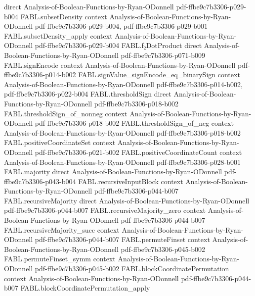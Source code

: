 \begin{theorem}
  {direct}
  {Analysis-of-Boolean-Functions-by-Ryan-ODonnell}
  {pdf-ffbe9c7b3306-p029-b004}
\proofstep
  {FABL.subsetDensity}
  {context}
  {Analysis-of-Boolean-Functions-by-Ryan-ODonnell}
  {pdf-ffbe9c7b3306-p029-b004,
    pdf-ffbe9c7b3306-p029-b001}
\proofstep
  {FABL.subsetDensity_apply}
  {context}
  {Analysis-of-Boolean-Functions-by-Ryan-ODonnell}
  {pdf-ffbe9c7b3306-p029-b004}
\proofstep
  {FABL.f₂DotProduct}
  {direct}
  {Analysis-of-Boolean-Functions-by-Ryan-ODonnell}
  {pdf-ffbe9c7b3306-p071-b009}
\proofstep
  {FABL.signEncode}
  {context}
  {Analysis-of-Boolean-Functions-by-Ryan-ODonnell}
  {pdf-ffbe9c7b3306-p014-b002}
\proofstep
  {FABL.signValue_signEncode_eq_binarySign}
  {context}
  {Analysis-of-Boolean-Functions-by-Ryan-ODonnell}
  {pdf-ffbe9c7b3306-p014-b002,
    pdf-ffbe9c7b3306-p022-b004}
\proofstep
  {FABL.thresholdSign}
  {direct}
  {Analysis-of-Boolean-Functions-by-Ryan-ODonnell}
  {pdf-ffbe9c7b3306-p018-b002}
\proofstep
  {FABL.thresholdSign_of_nonneg}
  {context}
  {Analysis-of-Boolean-Functions-by-Ryan-ODonnell}
  {pdf-ffbe9c7b3306-p018-b002}
\proofstep
  {FABL.thresholdSign_of_neg}
  {context}
  {Analysis-of-Boolean-Functions-by-Ryan-ODonnell}
  {pdf-ffbe9c7b3306-p018-b002}
\proofstep
  {FABL.positiveCoordinateSet}
  {context}
  {Analysis-of-Boolean-Functions-by-Ryan-ODonnell}
  {pdf-ffbe9c7b3306-p021-b002}
\proofstep
  {FABL.positiveCoordinateCount}
  {context}
  {Analysis-of-Boolean-Functions-by-Ryan-ODonnell}
  {pdf-ffbe9c7b3306-p028-b001}
\proofstep
  {FABL.majority}
  {direct}
  {Analysis-of-Boolean-Functions-by-Ryan-ODonnell}
  {pdf-ffbe9c7b3306-p043-b004}
\proofstep
  {FABL.recursiveInputBlock}
  {context}
  {Analysis-of-Boolean-Functions-by-Ryan-ODonnell}
  {pdf-ffbe9c7b3306-p044-b007}
\proofstep
  {FABL.recursiveMajority}
  {direct}
  {Analysis-of-Boolean-Functions-by-Ryan-ODonnell}
  {pdf-ffbe9c7b3306-p044-b007}
\proofstep
  {FABL.recursiveMajority_zero}
  {context}
  {Analysis-of-Boolean-Functions-by-Ryan-ODonnell}
  {pdf-ffbe9c7b3306-p044-b007}
\proofstep
  {FABL.recursiveMajority_succ}
  {context}
  {Analysis-of-Boolean-Functions-by-Ryan-ODonnell}
  {pdf-ffbe9c7b3306-p044-b007}
\proofstep
  {FABL.permuteFinset}
  {context}
  {Analysis-of-Boolean-Functions-by-Ryan-ODonnell}
  {pdf-ffbe9c7b3306-p045-b002}
\proofstep
  {FABL.permuteFinset_symm}
  {context}
  {Analysis-of-Boolean-Functions-by-Ryan-ODonnell}
  {pdf-ffbe9c7b3306-p045-b002}
\proofstep
  {FABL.blockCoordinatePermutation}
  {context}
  {Analysis-of-Boolean-Functions-by-Ryan-ODonnell}
  {pdf-ffbe9c7b3306-p044-b007}
\proofstep
  {FABL.blockCoordinatePermutation_apply}

\end{theorem}
